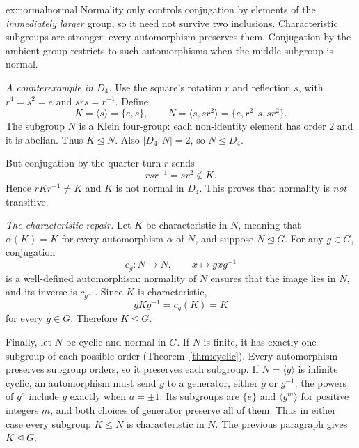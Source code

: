 \begin{solution}{ex:normalnormal}
\idea Normality only controls conjugation by elements of the \emph{immediately larger} group, so it need not survive two inclusions. Characteristic subgroups are stronger: every automorphism preserves them. Conjugation by the ambient group restricts to such automorphisms when the middle subgroup is normal.

\writeup \emph{A counterexample in $D_4$.} Use the square's rotation $r$ and reflection $s$, with $r^4=s^2=e$ and $srs=r^{-1}$. Define
\[
K=\langle s\rangle=\{e,s\},\qquad
N=\langle s,sr^2\rangle=\{e,r^2,s,sr^2\}.
\]
The subgroup $N$ is a Klein four-group: each non-identity element has order $2$ and it is abelian. Thus $K\trianglelefteq N$. Also $|D_4:N|=2$, so $N\trianglelefteq D_4$.

But conjugation by the quarter-turn $r$ sends
\[
rsr^{-1}=sr^2\notin K.
\]
Hence $rKr^{-1}\ne K$ and $K$ is not normal in $D_4$. This proves that normality is \emph{not} transitive.

\emph{The characteristic repair.} Let $K$ be characteristic in $N$, meaning that $\alpha(K)=K$ for every automorphism $\alpha$ of $N$, and suppose $N\trianglelefteq G$. For any $g\in G$, conjugation
\[
c_g:N\longrightarrow N,\qquad x\longmapsto gxg^{-1}
\]
is a well-defined automorphism: normality of $N$ ensures that the image lies in $N$, and its inverse is $c_{g^{-1}}$. Since $K$ is characteristic,
\[
gKg^{-1}=c_g(K)=K
\]
for every $g\in G$. Therefore $K\trianglelefteq G$.

Finally, let $N$ be cyclic and normal in $G$. If $N$ is finite, it has exactly one subgroup of each possible order (Theorem~\ref{thm:cyclic}). Every automorphism preserves subgroup orders, so it preserves each subgroup. If $N=\langle g\rangle$ is infinite cyclic, an automorphism must send $g$ to a generator, either $g$ or $g^{-1}$: the powers of $g^a$ include $g$ exactly when $a=\pm1$. Its subgroups are $\{e\}$ and $\langle g^m\rangle$ for positive integers $m$, and both choices of generator preserve all of them. Thus in either case every subgroup $K\le N$ is characteristic in $N$. The previous paragraph gives $K\trianglelefteq G$.
\end{solution}

